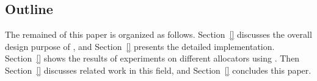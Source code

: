 \subsection*{Outline}

The remained of this paper is organized as follows. Section~\ref{} discusses the overall design purpose of \MP{}, and Section~\ref{} presents the detailed implementation. Section~\ref{} shows the results of experiments on different allocators using \MP{}. Then Section~\ref{} discusses related work in this field, and Section~\ref{} concludes this paper. 
